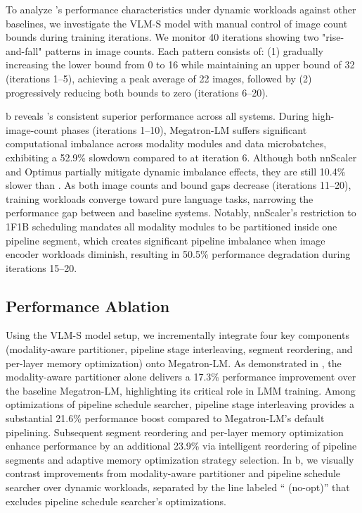 To analyze \sys{}'s performance characteristics under dynamic workloads against other baselines,
we investigate the VLM-S model with manual control of image count bounds during training iterations.
We monitor 40 iterations showing two "rise-and-fall" patterns in image counts.
Each pattern consists of:
(1) gradually increasing the lower bound from 0 to 16 while maintaining an upper bound of 32 (iterations 1--5), achieving a peak average of 22 images,
followed by (2) progressively reducing both bounds to zero (iterations 6--20).

b reveals \sys{}'s consistent superior performance across all systems.
During high-image-count phases (iterations 1--10),
Megatron-LM suffers significant computational imbalance across modality modules and data microbatches,
exhibiting a 52.9\% slowdown compared to \sys{} at iteration 6.
Although both nnScaler and Optimus partially mitigate dynamic imbalance effects,
they are still 10.4\% slower than \sys{}.
As both image counts and bound gaps decrease (iterations 11--20),
training workloads converge toward pure language tasks,
narrowing the performance gap between \sys{} and baseline systems.
Notably, nnScaler's restriction to 1F1B scheduling mandates all modality modules to be partitioned inside one pipeline segment,
which creates significant pipeline imbalance when image encoder workloads diminish,
resulting in 50.5\% performance degradation during iterations 15--20.

\subsection{Performance Ablation}

Using the VLM-S model setup,
we incrementally integrate four key components
(modality-aware partitioner, pipeline stage interleaving, segment reordering, and per-layer memory optimization)
onto Megatron-LM.
As demonstrated in ,
the modality-aware partitioner alone delivers a 17.3\% performance improvement over the baseline Megatron-LM,
highlighting its critical role in LMM training.
Among optimizations of pipeline schedule searcher,
pipeline stage interleaving provides a substantial 21.6\% performance boost compared to Megatron-LM's default pipelining.
Subsequent segment reordering and per-layer memory optimization enhance performance by an additional 23.9\%
via intelligent reordering of pipeline segments and adaptive memory optimization strategy selection.
In b, we visually contrast improvements from modality-aware partitioner and pipeline schedule searcher over dynamic workloads,
separated by the line labeled ``\sys{} (no-opt)'' that excludes pipeline schedule searcher's optimizations.

